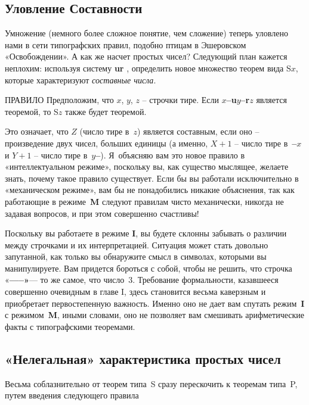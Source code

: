 \documentclass[../main.tex]{subfiles}
\begin{document}
\subsection{Уловление Составности}

Умножение (немного более сложное понятие, чем сложение) теперь уловлено нами в сети типографских правил, подобно птицам в Эшеровском «Освобождении».
А как же насчет простых чисел?
Следующий план кажется неплохим: используя систему \textbf{ur} , определить новое множество теорем вида S$x$, которые характеризуют \emph{составные числа}.

\begin{mybox}{ПРАВИЛО}
    Предположим, что $x$, $y$, $z$ \--- строчки тире.
    Если \textbf{$x$--u$y$--r$z$} является теоремой, то S$z$ также будет теоремой.
\end{mybox}

Это означает, что $Z$ (число тире в~$z$) является составным, если оно \--- произведение двух чисел, больших единицы (а именно, $X + 1$ \--- число тире в~\textbf{--$x$} и $Y + 1$ \--- число тире в~\textbf{$y$--}).
Я~объясняю вам это новое правило в «интеллектуальном режиме», поскольку вы, как существо мыслящее, желаете знать, почему такое правило существует.
Если бы вы работали исключительно в «механическом режиме», вам бы не понадобились никакие объяснения, так как работающие в режиме~\textbf{M} следуют правилам чисто механически, никогда не задавая вопросов, и при этом совершенно счастливы!

Поскольку вы работаете в режиме \textbf{I}, вы будете склонны забывать о различии между строчками и их интерпретацией. Ситуация может стать довольно запутанной, как только вы обнаружите смысл в символах, которыми вы манипулируете.
Вам придется бороться с собой, чтобы не решить, что строчка «\textbf{--{}--{}--»}--- то же самое, что число~3.
Требование формальности, казавшееся совершенно очевидным в главе I, здесь становится весьма каверзным и приобретает первостепенную важность.
Именно оно не дает вам спутать режим~\textbf{I} с режимом~\textbf{M}, иными словами, оно не позволяет вам смешивать арифметические факты с типографскими теоремами.


\subsection{«Нелегальная» характеристика простых чисел}

Весьма соблазнительно от теорем типа~S сразу перескочить к теоремам типа~P, путем введения следующего правила
\end{document}
